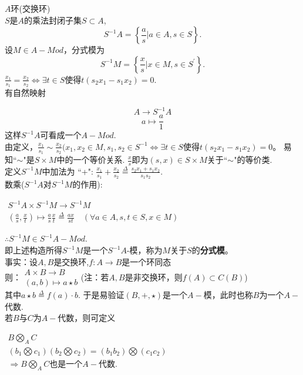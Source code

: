 \documentclass[UTF8]{article}
\begin{document}
$A$环(交换环)\\
$S$是$A$的乘法封闭子集$S\subset A$,
$$S^{-1}A=\left\{\frac{a}{s}|a\in A, s\in S\right\}.$$
设$M\in A-Mod$，分式模为
$$S^{-1}M=\left\{\frac{x}{s}|x\in M, s\in S^\prime\right\}.$$
$\frac{x_1}{s_1}=\frac{x_2}{s_2}\Leftrightarrow \exists t\in S$使得$t(s_2x_1-s_1x_2)=0.$\\
有自然映射

$$
A\rightarrow S^{-1} A$$
$$
a\mapsto \frac{a}{1}
$$
这样$S^{-1}A$可看成一个$A-Mod$.\\
由定义，$\frac{x_1}{s_1}\sim\frac{x_2}{s_2}(x_1,x_2\in M, s_1, s_2\in S^{-1}\Leftrightarrow \exists t\in S$使得$t(s_2x_1-s_1x_2)=0$。
易知``$\sim$"是$S\times M$中的一个等价关系.
$\frac{x}{s}$即为$(s,x)\in S\times M$关于``$\sim$"的等价类.\\
定义$S^{-1}M$中加法为
\noindent ``+": $\frac{x_1}{s_1}+\frac{x_2}{s_2}\stackrel{\Delta}{=}\frac{s_2x_1+s_1x_2}{s_1s_2}.$\\
数乘($S^{-1}A$对$S^{-1}M$的作用):
\begin{center}
	$\begin{array}{l}
	S^{-1}A\times S^{-1}M\rightarrow S^{-1}M\\
	\left(\frac{a}{s},\frac{x}{t}\right)\mapsto \frac{a}{s}\frac{x}{t}\stackrel{\Delta}{=}\frac{ax}{st}\quad(\forall a\in A, s,t\in S, x\in M)
	\end{array}$
\end{center}
$\therefore S^{-1}M\in S^{-1}A-Mod$.\\
即上述构造所得$S^{-1}M$是一个$S^{-1}A$-模，称为$M$关于$S$的\textbf{分式模}。\\
事实：设$A,B$是交换环,$f:A\rightarrow B$是一个环同态\\
则：$\begin{array}{l}
A\times B\rightarrow B\\
(a,b)\mapsto a\star b
\end{array}$(注：若$A,B$是非交换环，则$f(A)\subset C(B)$)\\
其中$a\star b\stackrel{\Delta}{=}f(a)\cdot b$.
于是易验证$(B,+,\star)$是一个$A-$模，此时也称$B$为一个$A-$代数.\\
若$B$与$C$为$A-$代数，则可定义\\
\begin{center}
	$\begin{array}{l}
	B\bigotimes_AC\\
	(b_1\bigotimes c_1)(b_2 \bigotimes c_2)=(b_1b_2)\bigotimes(c_1c_2)\\
	\Rightarrow B\bigotimes_AC\text{也是一个}A-\text{代数.}
	\end{array}$
\end{center}
\end{document}

